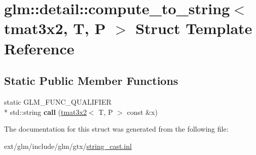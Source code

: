 \hypertarget{structglm_1_1detail_1_1compute__to__string_3_01tmat3x2_00_01_t_00_01_p_01_4}{\section{glm\-:\-:detail\-:\-:compute\-\_\-to\-\_\-string$<$ tmat3x2, T, P $>$ Struct Template Reference}
\label{structglm_1_1detail_1_1compute__to__string_3_01tmat3x2_00_01_t_00_01_p_01_4}
}
\subsection*{Static Public Member Functions}
\begin{DoxyCompactItemize}
\item 
\hypertarget{structglm_1_1detail_1_1compute__to__string_3_01tmat3x2_00_01_t_00_01_p_01_4_a08dc9495d864f76f2b163459d1d81de9}{static G\-L\-M\-\_\-\-F\-U\-N\-C\-\_\-\-Q\-U\-A\-L\-I\-F\-I\-E\-R \\*
std\-::string {\bfseries call} (\hyperlink{structglm_1_1tmat3x2}{tmat3x2}$<$ T, P $>$ const \&x)}\label{structglm_1_1detail_1_1compute__to__string_3_01tmat3x2_00_01_t_00_01_p_01_4_a08dc9495d864f76f2b163459d1d81de9}

\end{DoxyCompactItemize}


The documentation for this struct was generated from the following file\-:\begin{DoxyCompactItemize}
\item 
ext/glm/include/glm/gtx/\hyperlink{string__cast_8inl}{string\-\_\-cast.\-inl}\end{DoxyCompactItemize}
